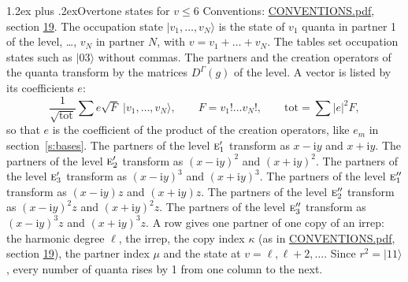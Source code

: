 \documentclass[10pt,a4paper]{article}
\makeatletter
\renewcommand\section{\@startsection{section}{1}{\z@}{-3ex plus -1ex minus -.2ex}%
  {1.2ex plus .2ex}{\normalfont\large\sffamily\bfseries\color{parttitle}}}
\numberwithin{equation}{section}
\newcommand{\irr}[1]{\text{\normalfont\scshape #1}}
\newcommand{\iunit}{\mathrm{i}}
\newcommand{\repD}[1]{D^{#1}}
\newcommand{\mult}{\kappa}
\newcommand{\intx}{\mu}
\newcommand{\occ}[1]{\lvert #1\rangle}
\makeatother
\begin{document}
\section{Overtone states for \texorpdfstring{$v \le 6$}{v \textleq\ 6}}\label{s:overtone_states}
Conventions: \href{../../CONVENTIONS.pdf}{CONVENTIONS.pdf}, section \href{../../CONVENTIONS.pdf\#conv.19}{19}.
\leavevmode\label{n:vector.occupation}\label{n:local.quanta.partner}\label{n:local.weight.occupation}The occupation state $\occ{v_1, \dots, v_N}$ is the state of $v_1$ quanta in partner 1 of the level, \dots, $v_N$ in partner $N$, with $v = v_1 + \dots + v_N$. The tables set occupation states such as $\occ{03}$ without commas. The partners and the creation operators of the quanta transform by the matrices $\repD{\Gamma}(g)$ of the level. A vector is listed by its coefficients $e$:
\begin{equation}\label{e:occupation}\frac{1}{\sqrt{\mathrm{tot}}}\sum e\sqrt{F}\;\occ{v_1, \dots, v_N},\qquad F = v_1!\dots v_N!,\qquad \mathrm{tot} = \sum |e|^2F,\end{equation}
so that $e$ is the coefficient of the product of the creation operators, like $e_m$ in section~\ref{s:bases}. The partners of the level $\irr{e}_{1}'$ transform as $x - \iunit y$ and $x + \iunit y$. The partners of the level $\irr{e}_{2}'$ transform as $(x - \iunit y)^{2}$ and $(x + \iunit y)^{2}$. The partners of the level $\irr{e}_{3}'$ transform as $(x - \iunit y)^{3}$ and $(x + \iunit y)^{3}$. The partners of the level $\irr{e}_{1}''$ transform as $(x - \iunit y) z$ and $(x + \iunit y) z$. The partners of the level $\irr{e}_{2}''$ transform as $(x - \iunit y)^{2} z$ and $(x + \iunit y)^{2} z$. The partners of the level $\irr{e}_{3}''$ transform as $(x - \iunit y)^{3} z$ and $(x + \iunit y)^{3} z$. A row gives one partner of one copy of an irrep: the harmonic degree $\ell$, the irrep, the copy index $\mult$ (as in \href{../../CONVENTIONS.pdf}{CONVENTIONS.pdf}, section \href{../../CONVENTIONS.pdf\#conv.19}{19}), the partner index $\intx$ and the state at $v = \ell, \ell + 2, \dots$. Since $r^2 = \occ{11}$, every number of quanta rises by 1 from one column to the next.
\end{document}
